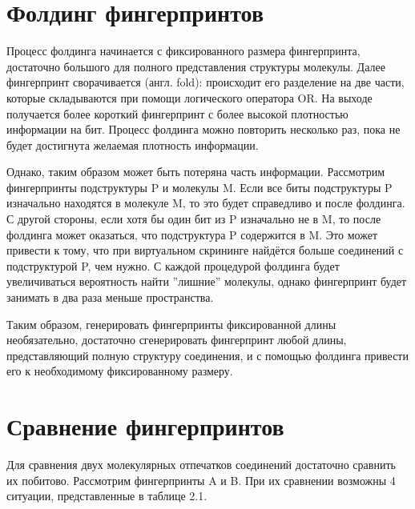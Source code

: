 \documentclass[a4paper,14pt]{extreport}
\begin{document}
  \section{Фолдинг фингерпринтов}
  \label{s:fp_folding_sec}
 Процесс фолдинга начинается с фиксированного размера фингерпринта, достаточно большого для полного представления структуры молекулы. Далее фингерпринт сворачивается (англ. fold): происходит его разделение на две части, которые складываются при помощи логического оператора OR. На выходе получается более короткий фингерпринт с более высокой плотностью информации на бит. Процесс фолдинга можно повторить несколько раз, пока не будет достигнута желаемая плотность информации.
 
Однако, таким образом может быть потеряна часть информации. Рассмотрим фингерпринты подструктуры P и молекулы M. Если все биты подструктуры P изначально находятся в молекуле M, то это будет справедливо и после фолдинга. С другой стороны, если хотя бы один бит из P изначально не в M, то после фолдинга может оказаться, что подструктура P содержится в M. Это может привести к тому, что при виртуальном скрининге найдётся больше соединений с подструктурой P, чем нужно. С каждой процедурой фолдинга будет увеличиваться вероятность найти ''лишние'' молекулы, однако фингерпринт будет занимать в два раза меньше пространства.

Таким образом, генерировать фингерпринты фиксированной длины необязательно, достаточно сгенерировать фингерпринт любой длины, представляющий полную структуру соединения, и с помощью фолдинга привести его к необходимому фиксированному размеру. 
 
  
  \section{Сравнение фингерпринтов}
  \label{s:fp_comparing_sec}
Для сравнения двух молекулярных отпечатков соединений достаточно сравнить их побитово. Рассмотрим фингерпринты A и B. При их сравнении возможны 4 ситуации, представленные в таблице 2.1.
  
\end{document}

